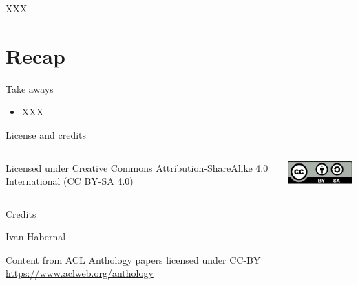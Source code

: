 \documentclass[12pt,aspectratio=169,handout]{beamer}
\begin{document}
\begin{frame}{XXX}
	
\end{frame}



\section*{Recap}

\begin{frame}{Take aways}
	
\begin{itemize}
	
	\item XXX
\end{itemize}
	
\end{frame}



\begin{frame}{License and credits}

	\begin{columns}
		\begin{column}{0.7\textwidth}
			Licensed under Creative Commons Attribution-ShareAlike 4.0 International (CC BY-SA 4.0)
		\end{column}
		\begin{column}{0.2\textwidth}
			\includegraphics[width=0.9\linewidth]{img/cc-by-sa-icon.pdf}
		\end{column}
	\end{columns}
	
	\bigskip
	
	Credits
	
	\begin{scriptsize}
		
		Ivan Habernal
		
		Content from ACL Anthology papers licensed under CC-BY \url{https://www.aclweb.org/anthology}
		
	\end{scriptsize}
	
\end{frame}
\end{document}

